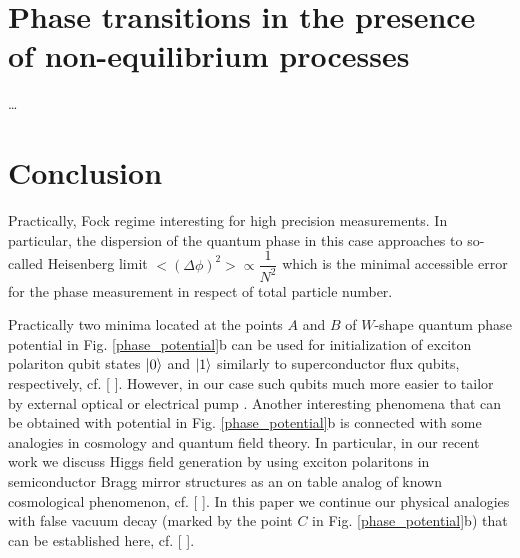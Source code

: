 \documentclass[aps, pre, preprint, groupedaddress, superscriptaddress, showkeys, showpacs] {revtex4-1}
\DeclarePairedDelimiter\ket{\lvert}{\rangle}
\begin{document}
\section{Phase transitions in the presence of non-equilibrium processes 
\label{sec:phase_transition}}


\dots

\section{Conclusion \label{sec:conclusion}}

Practically, Fock regime interesting for high precision measurements.
In particular, the dispersion of the quantum phase in this case approaches to so-called Heisenberg limit ${<(\Delta\phi)^2> \propto \dfrac{1}{N^2}}$ which is the minimal accessible error for the phase measurement in respect of total particle number.

Practically two minima located at the points $A$ and $B$ of $W$-shape quantum phase potential in Fig. \ref{phase_potential}b can be used for initialization of exciton polariton qubit states $\ket{0}$ and $\ket{1}$ similarly to superconductor flux qubits, respectively, {\red cf. [ ]}.
However, in our case such qubits much more easier to tailor by external optical or electrical pump {\red [ ]}.
Another interesting phenomena that can be obtained with potential in Fig. \ref{phase_potential}b is connected with some analogies in cosmology and quantum field theory.
In particular, in our recent work {\red [ ]} we discuss Higgs field generation by using exciton polaritons in semiconductor Bragg mirror structures as an on table analog of known cosmological phenomenon, {\red cf. [ ]}.
In this paper we continue our physical analogies with false vacuum decay (marked by the point $C$ in Fig. \ref{phase_potential}b) that can be established here, {\red cf. [ ]}.

\pagebreak


\end{document}
